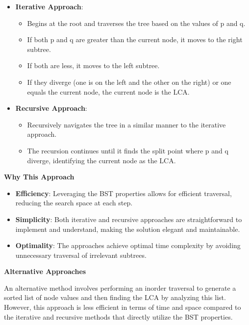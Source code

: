 \begin{itemize}
    \item \textbf{Iterative Approach}: 
    \begin{itemize}
        \item Begins at the root and traverses the tree based on the values of p and q.
        \item If both p and q are greater than the current node, it moves to the right subtree.
        \item If both are less, it moves to the left subtree.
        \item If they diverge (one is on the left and the other on the right) or one equals the current node, the current node is the LCA.
    \end{itemize}
    
    \item \textbf{Recursive Approach}: 
    \begin{itemize}
        \item Recursively navigates the tree in a similar manner to the iterative approach.
        \item The recursion continues until it finds the split point where p and q diverge, identifying the current node as the LCA.
    \end{itemize}
\end{itemize}

\textbf{Why This Approach}

\begin{itemize}
    \item \textbf{Efficiency}: Leveraging the BST properties allows for efficient traversal, reducing the search space at each step.
    \item \textbf{Simplicity}: Both iterative and recursive approaches are straightforward to implement and understand, making the solution elegant and maintainable.
    \item \textbf{Optimality}: The approaches achieve optimal time complexity by avoiding unnecessary traversal of irrelevant subtrees.
\end{itemize}

\textbf{Alternative Approaches}

An alternative method involves performing an inorder traversal to generate a sorted list of node values and then finding the LCA by analyzing this list. However, this approach is less efficient in terms of time and space compared to the iterative and recursive methods that directly utilize the BST properties.

